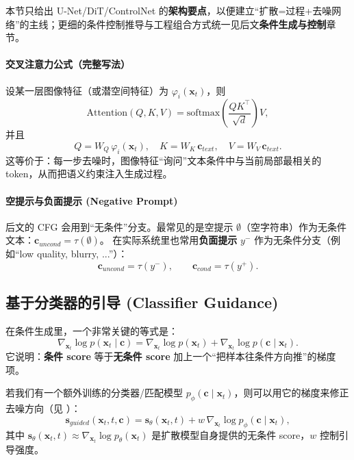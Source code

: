 \documentclass[zihao=-4, fontset=windows]{ctexart}
\begin{document}
\begin{note}[阅读提示]
本节只给出 U-Net/DiT/ControlNet 的\textbf{架构要点}，以便建立“扩散=过程+去噪网络”的主线；更细的条件控制推导与工程组合方式统一见后文\textbf{条件生成与控制}章节。
\end{note}

\paragraph{交叉注意力公式（完整写法）}
设某一层图像特征（或潜空间特征）为 $\varphi_i(\mathbf{x}_t)$，则
\begin{equation}
    \text{Attention}(Q,K,V)=\text{softmax}\left(\frac{QK^\top}{\sqrt{d}}\right)V,
\end{equation}
并且
\begin{equation}
    Q=W_Q\,\varphi_i(\mathbf{x}_t),\quad K=W_K\,\mathbf{c}_{text},\quad V=W_V\,\mathbf{c}_{text}.
\end{equation}
这等价于：每一步去噪时，图像特征“询问”文本条件中与当前局部最相关的 token，从而把语义约束注入生成过程。

\paragraph{空提示与负面提示 (Negative Prompt)}
后文的 CFG 会用到“无条件”分支。最常见的是空提示 $\emptyset$（空字符串）作为无条件文本：$\mathbf{c}_{uncond}=\tau(\emptyset)$。
在实际系统里也常用\textbf{负面提示} $y^{-}$ 作为无条件分支（例如“low quality, blurry, ...”）：
\begin{equation}
    \mathbf{c}_{uncond}=\tau(y^{-}),\qquad \mathbf{c}_{cond}=\tau(y^{+}).
\end{equation}

\subsection{基于分类器的引导 (Classifier Guidance)}

在条件生成里，一个非常关键的等式是：
\begin{equation}
    \nabla_{\mathbf{x}_t}\log p(\mathbf{x}_t\mid \mathbf{c}) = \nabla_{\mathbf{x}_t}\log p(\mathbf{x}_t) + \nabla_{\mathbf{x}_t}\log p(\mathbf{c}\mid \mathbf{x}_t).
\end{equation}
它说明：\textbf{条件 score} 等于\textbf{无条件 score} 加上一个“把样本往条件方向推”的梯度项。

若我们有一个额外训练的分类器/匹配模型 $p_\phi(\mathbf{c}\mid \mathbf{x}_t)$，则可以用它的梯度来修正去噪方向（见 \cite{dhariwal2021diffusion}）：
\begin{equation}
    \mathbf{s}_{guided}(\mathbf{x}_t,t,\mathbf{c}) = \mathbf{s}_\theta(\mathbf{x}_t,t) + w\,\nabla_{\mathbf{x}_t}\log p_\phi(\mathbf{c}\mid \mathbf{x}_t),
\end{equation}
其中 $\mathbf{s}_\theta(\mathbf{x}_t,t)\approx \nabla_{\mathbf{x}_t}\log p_\theta(\mathbf{x}_t)$ 是扩散模型自身提供的无条件 score，$w$ 控制引导强度。
\end{document}
